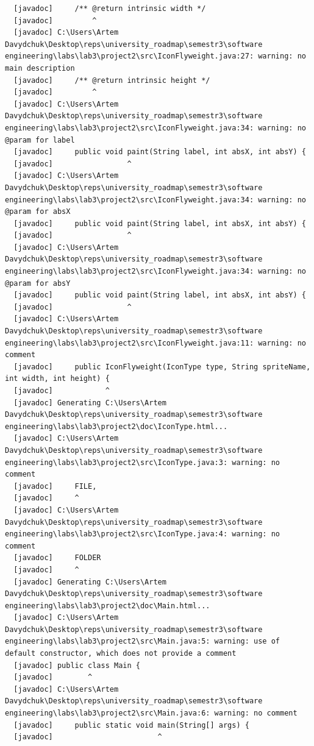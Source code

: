 \documentclass[12pt,a4paper]{article}
\begin{document}
\begin{verbatim}
  [javadoc]     /** @return intrinsic width */
  [javadoc]         ^
  [javadoc] C:\Users\Artem Davydchuk\Desktop\reps\university_roadmap\semestr3\software engineering\labs\lab3\project2\src\IconFlyweight.java:27: warning: no main description
  [javadoc]     /** @return intrinsic height */
  [javadoc]         ^
  [javadoc] C:\Users\Artem Davydchuk\Desktop\reps\university_roadmap\semestr3\software engineering\labs\lab3\project2\src\IconFlyweight.java:34: warning: no @param for label
  [javadoc]     public void paint(String label, int absX, int absY) {
  [javadoc]                 ^
  [javadoc] C:\Users\Artem Davydchuk\Desktop\reps\university_roadmap\semestr3\software engineering\labs\lab3\project2\src\IconFlyweight.java:34: warning: no @param for absX
  [javadoc]     public void paint(String label, int absX, int absY) {
  [javadoc]                 ^
  [javadoc] C:\Users\Artem Davydchuk\Desktop\reps\university_roadmap\semestr3\software engineering\labs\lab3\project2\src\IconFlyweight.java:34: warning: no @param for absY
  [javadoc]     public void paint(String label, int absX, int absY) {
  [javadoc]                 ^
  [javadoc] C:\Users\Artem Davydchuk\Desktop\reps\university_roadmap\semestr3\software engineering\labs\lab3\project2\src\IconFlyweight.java:11: warning: no comment
  [javadoc]     public IconFlyweight(IconType type, String spriteName, int width, int height) {
  [javadoc]            ^
  [javadoc] Generating C:\Users\Artem Davydchuk\Desktop\reps\university_roadmap\semestr3\software engineering\labs\lab3\project2\doc\IconType.html...
  [javadoc] C:\Users\Artem Davydchuk\Desktop\reps\university_roadmap\semestr3\software engineering\labs\lab3\project2\src\IconType.java:3: warning: no comment
  [javadoc]     FILE,
  [javadoc]     ^
  [javadoc] C:\Users\Artem Davydchuk\Desktop\reps\university_roadmap\semestr3\software engineering\labs\lab3\project2\src\IconType.java:4: warning: no comment
  [javadoc]     FOLDER
  [javadoc]     ^
  [javadoc] Generating C:\Users\Artem Davydchuk\Desktop\reps\university_roadmap\semestr3\software engineering\labs\lab3\project2\doc\Main.html...
  [javadoc] C:\Users\Artem Davydchuk\Desktop\reps\university_roadmap\semestr3\software engineering\labs\lab3\project2\src\Main.java:5: warning: use of default constructor, which does not provide a comment
  [javadoc] public class Main {
  [javadoc]        ^
  [javadoc] C:\Users\Artem Davydchuk\Desktop\reps\university_roadmap\semestr3\software engineering\labs\lab3\project2\src\Main.java:6: warning: no comment
  [javadoc]     public static void main(String[] args) {
  [javadoc]                        ^

\end{verbatim}
\end{document}
